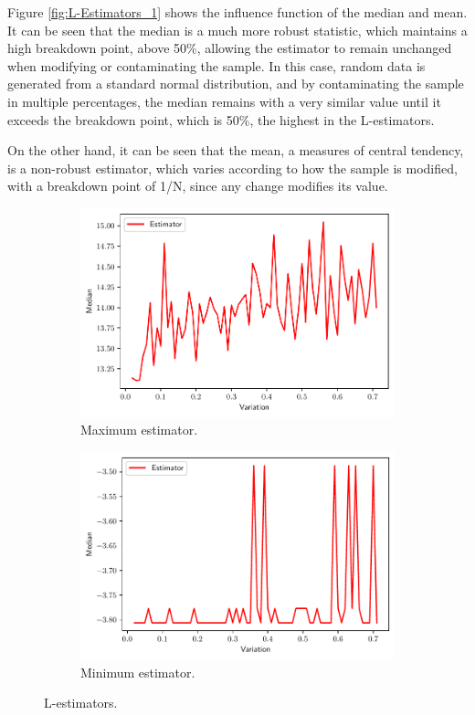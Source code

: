 \documentclass[11pt]{article}
\theoremstyle{definition}
\theoremstyle{remark}
\theoremstyle{remark}
\begin{document}
Figure \ref{fig:L-Estimators_1} shows the influence function of the
median and mean. It can be seen that the median is a much more robust
statistic, which maintains a high breakdown point, above 50\%, allowing the
estimator to remain unchanged when modifying or contaminating the
sample. In this case, random data is generated from a standard normal
distribution, and by contaminating the sample in multiple percentages,
the median remains with a very similar value until it exceeds the
breakdown point, which is 50\%, the highest in the L-estimators.

On the other hand, it can be seen that the mean, a measures of central
tendency, is a non-robust estimator, which varies according to how the
sample is modified, with a breakdown point of 1/N, since any change
modifies its value.

\begin{figure}[H]
  \centering
  \begin{subfigure}[t]{0.475\textwidth}
      \centering
      \includegraphics[scale=0.40]{../figs/max-L.pdf}
      \caption{Maximum estimator.}
  \end{subfigure}
  \begin{subfigure}[t]{0.475\textwidth}
      \centering
      \includegraphics[scale=0.40]{../figs/min-L.pdf}
      \caption{Minimum estimator.}
  \end{subfigure}
  \caption{L-estimators.}
  \label{fig:L-Estimators_2}
\end{figure}
\end{document}
